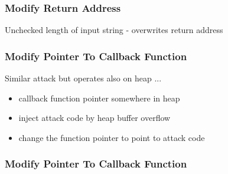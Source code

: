 \documentclass{beamer}
\begin{document}
\begin{frame}
	\frametitle{Modify Return Address}
	Unchecked length of input string - overwrites return address
	\begin{figure}[!h]
\begin{center}
\end{center}
\end{figure}

\end{frame}

\begin{frame}
	\frametitle{Modify Pointer To Callback Function}
	Similar attack but operates also on heap ...
	\begin{itemize}
		\item callback function pointer somewhere in heap
		\item inject attack code by heap buffer overflow
		\item change the function pointer to point to attack code
	\end{itemize}
\end{frame}

\begin{frame}
	\frametitle{Modify Pointer To Callback Function}
	\begin{figure}[!h]
\begin{center}
\end{center}
\end{figure}

\end{frame}
\end{document}
